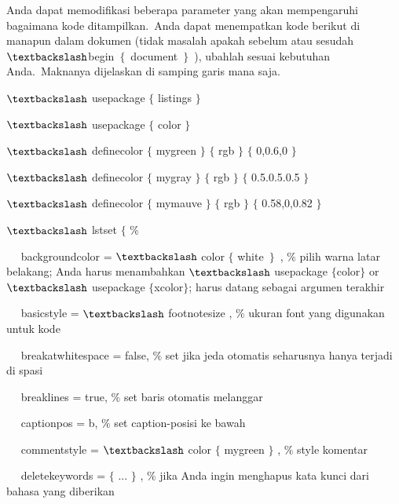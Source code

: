 Anda dapat memodifikasi beberapa parameter yang akan mempengaruhi bagaimana kode ditampilkan. Anda dapat menempatkan kode berikut di manapun dalam dokumen (tidak masalah apakah sebelum atau sesudah $\textbackslash$begin $ \{ $ document $ \} $ ), ubahlah sesuai kebutuhan Anda. Maknanya dijelaskan di samping garis mana saja.\par

 $\textbackslash$ usepackage $ \{ $ listings $ \} $\par

 $\textbackslash$ usepackage $ \{ $ color $ \} $\par

 $\textbackslash$ definecolor $ \{ $ mygreen $ \} $ $ \{ $ rgb $ \} $ $ \{ $ 0,0.6,0 $ \} $\par

 $\textbackslash$ definecolor $ \{ $ mygray $ \} $ $ \{ $ rgb $ \} $ $ \{ $ 0.5.0.5.0.5 $ \} $\par

 $\textbackslash$ definecolor $ \{ $ mymauve $ \} $ $ \{ $ rgb $ \} $ $ \{ $ 0.58,0,0.82 $ \} $\par

 $\textbackslash$ lstset $ \{ $ $\%$\par

~~ backgroundcolor = $\textbackslash$ color $ \{ $ white~$ \} $~, $\%$ pilih warna latar belakang;  Anda harus menambahkan $\textbackslash$ usepackage $ \{ $color$ \} $ or $\textbackslash$ usepackage $ \{ $xcolor$ \} $;  harus datang sebagai argumen terakhir\par

~~ basicstyle = $\textbackslash$ footnotesize , $\%$ ukuran font yang digunakan untuk kode\par

~~ breakatwhitespace = false, $\%$ set jika jeda otomatis seharusnya hanya terjadi di spasi\par

~~ breaklines = true, $\%$ set baris otomatis melanggar\par

~~ captionpos = b, $\%$ set caption-posisi ke bawah\par

~~ commentstyle = $\textbackslash$ color $ \{ $ mygreen $ \} $ , $\%$ style komentar\par

~~ deletekeywords = $ \{ $ ... $ \} $ , $\%$ jika Anda ingin menghapus kata kunci dari bahasa yang diberikan\par


